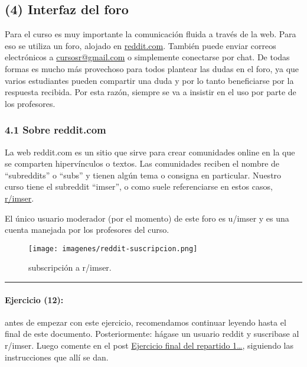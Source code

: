 \documentclass[]{article}
\makeatletter
\def\maxwidth{\ifdim\Gin@nat@width>\linewidth\linewidth
\else\Gin@nat@width\fi}
\let\Oldincludegraphics\includegraphics
\renewcommand{\includegraphics}[1]{\Oldincludegraphics[width=\maxwidth]{#1}}
\makeatother
\begin{document}
\subsection{(4) Interfaz del foro}

Para el curso es muy importante la comunicación fluida a través de la
web. Para eso se utiliza un foro, alojado en
\href{reddit.com/r/imser}{reddit.com}. También puede enviar correos
electrónicos a \href{mailto:cursosr@gmail.com}{cursosr@gmail.com} o
simplemente conectarse por chat. De todas formas es mucho más provechoso
para todos plantear las dudas en el foro, ya que varios estudiantes
pueden compartir una duda y por lo tanto beneficiarse por la respuesta
recibida. Por esta razón, siempre se va a insistir en el uso por parte
de los profesores.

\subsubsection{4.1 Sobre reddit.com}

La web reddit.com es un sitio que sirve para crear comunidades online en
la que se comparten hipervínculos o textos. Las comunidades reciben el
nombre de ``subreddits'' o ``subs'' y tienen algún tema o consigna en
particular. Nuestro curso tiene el subreddit ``imser'', o como suele
referenciarse en estos casos, \href{reddit.com/r/imser}{r/imser}.

El único usuario moderador (por el momento) de este foro es u/imser y es
una cuenta manejada por los profesores del curso.

\begin{figure}[htbp]
\centering
\texttt{[image: imagenes/reddit-suscripcion.png]}
\caption{subscripción a r/imser.}
\end{figure}

\begin{center}\rule{3in}{0.4pt}\end{center}

\paragraph{Ejercicio (12):}

antes de empezar con este ejercicio, recomendamos continuar leyendo
hasta el final de este documento. Posteriormente: hágase un usuario
reddit y suscribase al r/imser. Luego comente en el post
\href{http://www.reddit.com/r/imser/comments/1la8s8/ejercicio\_final\_del\_repartido\_1\_suscribirse\_a/}{Ejercicio
final del repartido 1\ldots{}}, siguiendo las instrucciones que allí se
dan.
\end{document}
